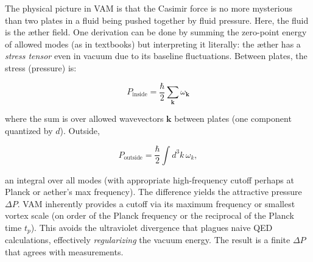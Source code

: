 \documentclass[a4paper, aps,preprint,superscriptaddress, 12pt]{revtex4}
\begin{document}
The physical picture in VAM is that the Casimir force is no more mysterious than two plates in a fluid being pushed together by fluid pressure. Here, the fluid is the æther field. One derivation can be done by summing the zero-point energy of allowed modes (as in textbooks) but interpreting it literally: the æther has a \textit{stress tensor} even in vacuum due to its baseline fluctuations. Between plates, the stress (pressure) is:

\begin{equation}
    P_{\text{inside}} = \frac{\hbar}{2}\sum_{\mathbf{k}}\omega_{\mathbf{k}}
\end{equation}

where the sum is over allowed wavevectors $\mathbf{k}$ between plates (one component quantized by $d$). Outside,

\begin{equation}
    P_{\text{outside}} = \frac{\hbar}{2}\int d^3k\,\omega_{k},
\end{equation}

an integral over all modes (with appropriate high-frequency cutoff perhaps at Planck or aether’s max frequency). The difference yields the attractive pressure $\Delta P$. VAM inherently provides a cutoff via its maximum frequency or smallest vortex scale (on order of the Planck frequency or the reciprocal of the Planck time $t_p$). This avoids the ultraviolet divergence that plagues naive QED calculations, effectively \textit{regularizing} the vacuum energy. The result is a finite $\Delta P$ that agrees with measurements.
\end{document}
